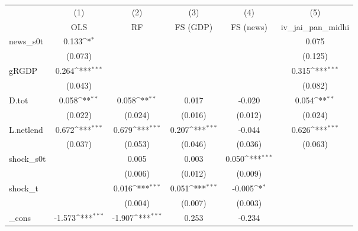 {
\def\sym#1{\ifmmode^{#1}\else\(^{#1}\)\fi}
\begin{tabular}{l*{5}{c}}
\toprule
            &\multicolumn{1}{c}{(1)}&\multicolumn{1}{c}{(2)}&\multicolumn{1}{c}{(3)}&\multicolumn{1}{c}{(4)}&\multicolumn{1}{c}{(5)}\\
            &\multicolumn{1}{c}{OLS}&\multicolumn{1}{c}{RF}&\multicolumn{1}{c}{FS (GDP)}&\multicolumn{1}{c}{FS (news)}&\multicolumn{1}{c}{iv\_jai\_pan\_midhi}\\
\midrule
news\_s0t    &       0.133\sym{*}  &                     &                     &                     &       0.075         \\
            &     (0.073)         &                     &                     &                     &     (0.125)         \\
\addlinespace
gRGDP       &       0.264\sym{***}&                     &                     &                     &       0.315\sym{***}\\
            &     (0.043)         &                     &                     &                     &     (0.082)         \\
\addlinespace
D.tot       &       0.058\sym{**} &       0.058\sym{**} &       0.017         &      -0.020         &       0.054\sym{**} \\
            &     (0.022)         &     (0.024)         &     (0.016)         &     (0.012)         &     (0.024)         \\
\addlinespace
L.netlend   &       0.672\sym{***}&       0.679\sym{***}&       0.207\sym{***}&      -0.044         &       0.626\sym{***}\\
            &     (0.037)         &     (0.053)         &     (0.046)         &     (0.036)         &     (0.063)         \\
\addlinespace
shock\_s0t   &                     &       0.005         &       0.003         &       0.050\sym{***}&                     \\
            &                     &     (0.006)         &     (0.012)         &     (0.009)         &                     \\
\addlinespace
shock\_t     &                     &       0.016\sym{***}&       0.051\sym{***}&      -0.005\sym{*}  &                     \\
            &                     &     (0.004)         &     (0.007)         &     (0.003)         &                     \\
\addlinespace
\_cons      &      -1.573\sym{***}&      -1.907\sym{***}&       0.253         &      -0.234         &                     \\

\end{tabular}}
